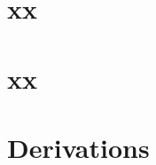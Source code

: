 \documentclass[12pt]{article}
\begin{document}
\section{ xx }
\label{sec:}


\section{ xx }
\label{sec:}



\section{ Derivations  }
\label{sec:derive}





\end{document}
